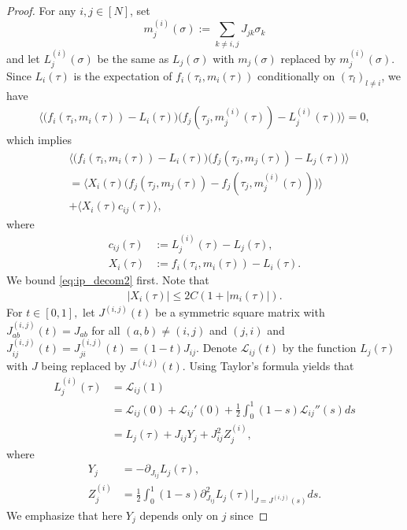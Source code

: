 \documentclass[10pt,a4paper]{amsart}
\let\gt=\tau \let\gth=\vartheta
\newcommand{\la}{\langle}
\renewcommand{\le}{\leqslant}
\newcommand{\mvgs}{{\sigma}}
\newcommand{\mvgt}{{\tau}}
\newcommand{\ra}{\rangle}
\begin{document}
\begin{proof}
For any $i,j\in[N]$, set 
$$
m_j^{(i)}(\mvgs):=\sum_{k\neq i, j}J_{jk}\sigma_k
$$ 
and let $L^{(i)}_j(\mvgs)$ be the same as $L_j(\mvgs)$ with $m_j(\mvgs)$ replaced by $m_j^{(i)}(\mvgs)$.
Since $L_i(\tau)$ is the expectation of $f_i(\tau_i, m_i(\mvgt))$ conditionally on $(\tau_l)_{l\neq i}$, we have
\begin{align*}
    \bigl\la\bigl(f_i(\tau_i,m_i(\mvgt))-L_i(\mvgt)\bigr)
    \bigl(f_j(\tau_j,m_j^{(i)}(\mvgt))-L_j^{(i)}(\mvgt)\bigr)\bigr\ra=0,
\end{align*}
which implies
\begin{align}
   &  \bigl\la \bigl(f_i(\tau_i, m_i(\mvgt) )-L_i(\mvgt)\bigr)\bigl(f_j(\tau_j, m_j(\mvgt) )-L_j(\mvgt)\bigr)\bigr\ra  \nonumber\\
    & = \bigl\la  X_i(\tau) \big (f_j(\tau_j, m_j(\mvgt))-f_j(\tau_j, m_j^{(i)}(\mvgt))\big ) \bigr\ra \label{eq:ip_decom1}\\
    & + \bigl\la X_i(\tau)c_{ij}(\mvgt)\bigr\ra, \label{eq:ip_decom2}
\end{align}
where
\begin{align*}
c_{ij}(\mvgt)&:=L_j^{(i)}(\mvgt)-L_j(\mvgt),\\
X_i(\gt)&:= f_i(\tau_i,  m_i(\mvgt) )-L_i(\mvgt).
\end{align*}
We bound \eqref{eq:ip_decom2} first.
Note that 
\begin{align}\label{ProofofCor2.2:eq0}
|X_i(\gt)| \le 2 C(1+|m_i(\tau)|).
\end{align}
For $t\in [0,1],$ let $J^{(i,j)}(t)$ be a symmetric square matrix with $J_{ab}^{(i,j)}(t)=J_{ab}$ for all $(a,b)\neq (i,j)$ and $(j,i)$ and $J_{ij}^{(i,j)}(t)=J_{ji}^{(i,j)}(t)=(1-t)J_{ij}.$ Denote $\mathcal{L}_{ij}(t)$ by the function $L_j(\tau)$ with $J$ being replaced by $J^{(i,j)}(t)$. Using Taylor's formula yields that
\begin{align*}
    L_j^{(i)}(\mvgt)&=\mathcal{L}_{ij}(1)\\
    &=\mathcal{L}_{ij}(0)+\mathcal{L}_{ij}'(0)+\frac{1}{2}\int_0^1(1-s)\mathcal{L}_{ij}''(s)ds\\
    &=L_j(\tau)+J_{ij}Y_j+J_{ij}^2Z_j^{(i)},
\end{align*}
where
\begin{align*}
    Y_j&=-\partial_{J_{ij}}L_j(\tau),\\
    Z_j^{(i)}&=\frac{1}{2}\int_0^1(1-s)\partial_{J_{ij}}^2L_j(\tau)\Big|_{J=J^{(i,j)}(s)}ds.
\end{align*}
We emphasize that here $Y_j$ depends only on $j$ since

\end{proof}
\end{document}
